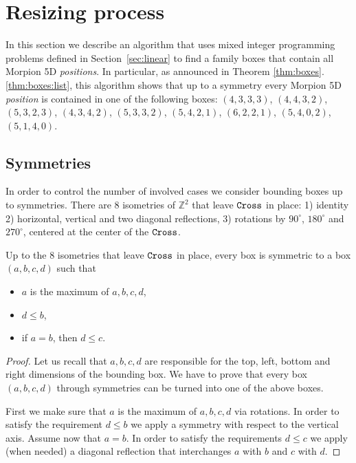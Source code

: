 
\section{Resizing process}
\label{sec:gemmating}

In this section we describe an algorithm that uses mixed integer programming problems defined
  in Section~\ref{sec:linear} to %
find a family boxes that contain all Morpion 5D \emph{positions}. In particular, as announced in Theorem \ref{thm:boxes}.\ref{thm:boxes:list},
this algorithm shows that up to a symmetry every Morpion 5D {\em position} is contained in one of the following boxes:
$(4, 3, 3, 3)$, $(4, 4, 3, 2)$, $(5, 3, 2, 3)$, $(4, 3, 4, 2)$, $(5, 3, 3, 2)$, $(5, 4, 2, 1)$, 
$(6, 2, 2, 1)$, $(5, 4, 0, 2)$, $(5, 1, 4, 0)$. 

\subsection{Symmetries}
\label{subsec:symmetries}

In order to control the number of involved cases we consider bounding boxes up to symmetries.
There are $8$ isometries of $\mathbb{Z}^2$ that leave $\texttt{Cross}$ in place: 
1) identity
2) horizontal, vertical and two diagonal reflections,
3) rotations by $90^\circ$, $180^\circ$ and $270^\circ$, centered at the center of the $\texttt{Cross}$.
  
\begin{lemma}
Up to the $8$ isometries that leave $\texttt{Cross}$ in place, every box is symmetric to a box $(a,b,c,d)$ such that
\begin{itemize}
\item $a$ is the maximum of $a,b,c,d$,
\item $d\leq b$,
\item if $a=b$, then $d\leq c$. 
\end{itemize}
\end{lemma}

\begin{proof}
Let us recall that $a,b,c,d$ are responsible for the top, left, bottom and right dimensions of the bounding box. 
We have to prove that every box $(a,b,c,d)$ through symmetries can be turned into one of the above boxes. 

First we make sure that $a$ is the maximum 
of $a,b,c,d$ via rotations. In order to satisfy the requirement $d\leq b$ we apply a symmetry with respect to the vertical axis. 
Assume now that $a=b$. In order to satisfy the requirements $d\leq c$ we apply (when needed) a diagonal reflection that interchanges $a$ with $b$ and $c$ with $d$.
\end{proof}


